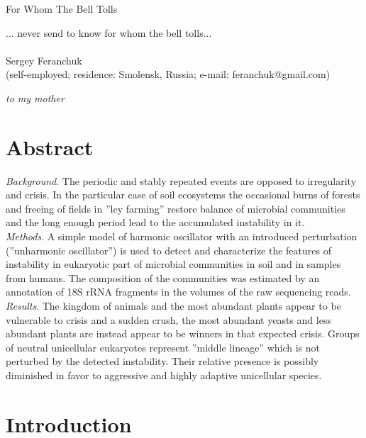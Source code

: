 \documentclass[a4paper]{article}
\begin{document}
\begin{center}
{\Large{For Whom The Bell Tolls}}
\vskip 5pt
\end{center}
{\small{... never send to know for whom the bell tolls...} }\\
\\
{Sergey Feranchuk}\\
{\small(self-employed; residence: Smolensk, Russia; e-mail: feranchuk@gmail.com)}
\vskip 5pt

\begin{flushright}
\small{ \textit{to my mother}}
\end{flushright}

\section*{Abstract}

\textit{Background}. The periodic and stably repeated events are opposed to irregularity and crisis. In the particular case of soil ecosystems the occasional burns of forests and freeing of fields in ''ley farming'' restore balance of microbial communities and the long enough period lead to the accumulated instability in it.\\
\textit{Methods}. A simple model of harmonic oscillator with an introduced perturbation (''unharmonic oscillator'') is used to detect and characterize the features of instability in eukaryotic part of microbial communities in soil and in samples from humans. The composition of the communities was estimated by an annotation of 18S rRNA fragments in the volumes of the raw sequencing reads. \\
\textit{Results}. The kingdom of animals and the most abundant plants appear to be vulnerable to crisis and a sudden crush, the most abundant yeasts and less abundant plants are instead appear to be winners in that expected crisis. Groups of neutral unicellular eukaryotes represent ''middle lineage'' which is not perturbed by the detected instability. Their relative presence is possibly diminished in favor to aggressive and highly adaptive unicellular species.



\clearpage

\section*{Introduction}
\end{document}
